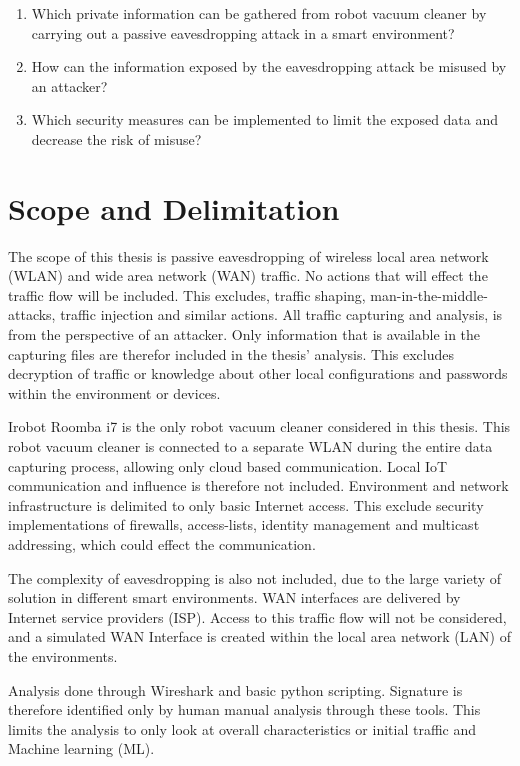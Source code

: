 \begin{enumerate}
    \item Which private information can be gathered from robot vacuum cleaner by carrying out a passive eavesdropping attack in a smart environment?
    \item How can the information exposed by the eavesdropping attack be misused by an attacker?
    \item Which security measures can be implemented to limit the exposed data and decrease the risk of misuse?
\end{enumerate}

\section{Scope and Delimitation}

The scope of this thesis is passive eavesdropping of wireless local area network (WLAN) and wide area network (WAN) traffic. No actions that will effect the traffic flow will be included. This excludes, traffic shaping, man-in-the-middle-attacks, traffic injection and similar actions. All traffic capturing and analysis, is from the perspective of an attacker. Only information that is available in the capturing files are therefor included in the thesis' analysis. This excludes decryption of traffic or knowledge about other local configurations and passwords within the environment or devices. 

Irobot Roomba i7 is the only robot vacuum cleaner considered in this thesis. This robot vacuum cleaner is connected to a separate WLAN during the entire data capturing process, allowing only cloud based communication. Local IoT communication and influence is therefore not included. Environment and network infrastructure is delimited to only basic Internet access. This exclude security implementations of firewalls, access-lists, identity management and multicast addressing, which could effect the communication. 

The complexity of eavesdropping is also not included, due to the large variety of solution in different smart environments. WAN interfaces are delivered by Internet service providers (ISP). Access to this traffic flow will not be considered, and a simulated WAN Interface is created within the local area network (LAN) of the environments. 

Analysis done through Wireshark and basic python scripting. Signature is therefore identified only by human manual analysis through these tools. This limits the analysis to only look at overall characteristics or initial traffic and Machine learning (ML).

